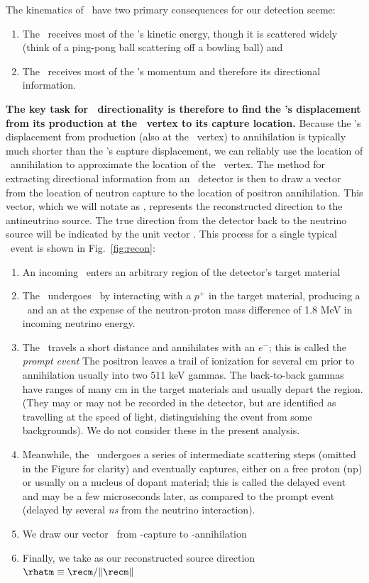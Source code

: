 The kinematics of \ibd\ have two primary consequences for our detection sceme:
\begin{enumerate}
  \item The \epc\ receives most of the \nbc's kinetic energy, though it is scattered widely (think of a ping-pong ball scattering off a bowling ball) and
  \item The \nnc\ receives most of the \nbc's momentum and therefore its directional information.
\end{enumerate}
\textbf{The key task for \ibd\ directionality is therefore to find the \nnc's displacement from its production at the \ibd\ vertex to its capture location.}
Because the \epc's displacement from production (also at the \ibd\ vertex) to annihilation is typically much shorter than the \nnc's capture displacement, we can reliably use the location of \epc\ annihilation to approximate the location of the \ibd\ vertex.
The method for extracting directional information from an \ibd\ detector is then to draw a vector from the location of neutron capture to the location of positron annihilation. %
This vector, which we will notate as \rec, represents the reconstructed direction to the antineutrino source.
The true direction from the detector back to the neutrino source will be indicated by the unit vector \snu.
This process for a single typical \ibd\ event is shown in Fig.~\ref{fig:recon}:
\begin{enumerate}
  \item An incoming \nbc\ enters an arbitrary region of the detector's target material
  \item The \nbc\ undergoes \ibd\ by interacting with a $p^+$ in the target material, producing a \nnc\ and an \epc at the expense of the neutron-proton mass difference of 1.8 MeV in incoming neutrino energy.
  \item The \epc\ travels a short distance and annihilates with an $e^-$; this is called the \emph{prompt event} The positron leaves a trail of ionization for several {cm} prior to annihilation usually into two {511 keV} gammas.  The back-to-back gammas have ranges of many {cm} in the target materials and usually depart the region.  (They may or may not be recorded in the detector, but are identified as travelling at the speed of light, distinguishing the event from some backgrounds). We do not consider these in the present analysis.
  
  \item Meanwhile, the \nnc\ undergoes a series of intermediate scattering steps (omitted in the Figure for clarity) and eventually captures, either on a free proton ({np}) or usually on a nucleus of dopant material; this is called the delayed event and may be a few microseconds later, as compared to the prompt event (delayed by several {\it ns} from the neutrino interaction).
  \item We draw our vector \rec\ from \nnc-capture to \epc-annihilation
  \item Finally, we take as our reconstructed source direction $\rhatm \equiv \recm / \| \recm \|$
\end{enumerate}
